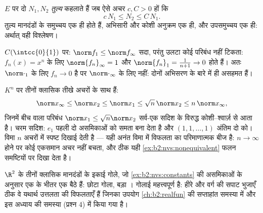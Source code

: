 \begin{definition}[तुल्य मानदंड]\label{def:b2:nvs:equivalent}
$E$ पर दो  $N_1, N_2$ \emph{तुल्य} कहलाते हैं जब ऐसे
अचर $c, C > 0$ हों कि
\[
c\,N_1 \leq N_2 \leq C\, N_1 .
\]
तुल्य मानदंडों के  समुच्चय एक ही होते हैं, अभिसारी और कोशी अनुक्रम
एक ही,  और  उपसमुच्चय एक ही: अर्थात् वही विश्लेषण।
\end{definition}

\begin{example}[अनंत विमा में अतुल्यता]\label{ex:b2:nvs:nonequivalent}
$C(\intcc{0}{1})$ पर: $\norm f_1 \leq \norm f_\infty$ सदा, परंतु उलटा कोई परिबंध नहीं टिकता: $f_n(x) = x^n$ के लिए $\norm{f_n}_\infty = 1$ और
$\norm{f_n}_1 = \frac{1}{n+1} \to 0$ होते हैं। अतः $\norm\cdot_1$ के लिए $f_n \to 0$ है पर $\norm\cdot_\infty$ के लिए नहीं: दोनों 
अभिसरण के बारे में ही असहमत हैं।
\end{example}

\begin{example}[विमा $n$ में स्पष्ट अचर]\label{ex:b2:nvs:constants}
$K^n$ पर तीनों क्लासिक  तीखे अचरों के साथ  हैं:
\[
\norm x_\infty \leq \norm x_2 \leq \norm x_1
\leq \sqrt n\,\norm x_2 \leq n\,\norm x_\infty ,
\]
जिनमें बीच वाला परिबंध $\norm x_1 \leq \sqrt n\norm x_2$ सर्व-एक सदिश के विरुद्ध कोशी--श्वार्ज़ से
आता है। चरम सदिश: $e_1$ पहली दो असमिकाओं को समता बना देता है और $(1, 1,
\dots, 1)$
अंतिम दो को। विमा $n$ अचरों में स्पष्ट दिखाई देती है --- यही अनंत विमा
में विफलता का परिमाणात्मक बीज है: $n \to \infty$ होने पर कोई एकसमान अचर नहीं बचता,
और ठीक यही \cref{ex:b2:nvs:nonequivalent} फलन समष्टियों पर दिखा देता है।
\end{example}

\begin{omfigure}

{\small $\R^2$ के तीनों क्लासिक मानदंडों के इकाई गोले, जो \cref{ex:b2:nvs:constants} की असमिकाओं
के अनुसार एक के भीतर एक बैठे हैं: छोटा गोला, बड़ा । गोलाई
महत्त्वपूर्ण है: हीरे और वर्ग की सपाट भुजाएँ ठीक वे यथार्थ उत्तलता की
विफलताएँ हैं जिनका उपयोग \cref{ch:b2:realfun} की सप्ताहांत समस्या में और इस अध्याय की
समस्या (प्रश्न 4) में किया गया है।}
\end{omfigure}

